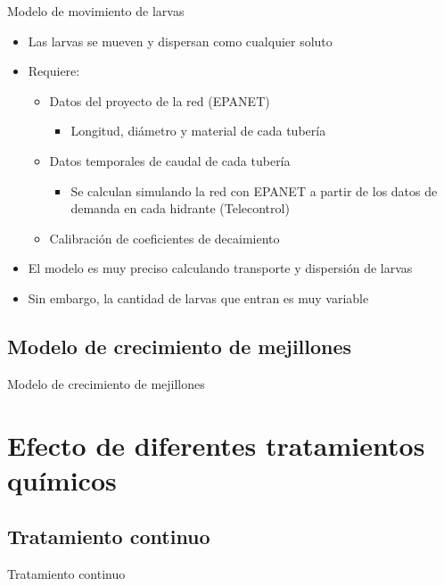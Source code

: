 \documentclass[pdr]{beamer}
\begin{document}
\begin{frame}{Modelo de movimiento de larvas}
	\begin{itemize}
		\item Las larvas se mueven y dispersan como cualquier soluto
		\item Requiere:
		\begin{itemize}
			\item Datos del proyecto de la red (EPANET)
			\begin{itemize}
				\item Longitud, diámetro y material de cada
					tubería
			\end{itemize}
			\item Datos temporales de caudal de cada tubería
			\begin{itemize}
				\item Se calculan simulando la red con EPANET a
					partir de los datos de demanda en cada
					hidrante (Telecontrol)
			\end{itemize}
			\item Calibración de coeficientes de decaimiento
		\end{itemize}
		\item El modelo es muy preciso calculando transporte y
			dispersión de larvas
		\item Sin embargo, la cantidad de larvas que entran es muy
			variable
	\end{itemize}
\end{frame}

\subsection{Modelo de crecimiento de mejillones}

\begin{frame}{Modelo de crecimiento de mejillones}
\end{frame}

\section{Efecto de diferentes tratamientos químicos}

\subsection{Tratamiento continuo}

\begin{frame}{Tratamiento continuo}
\end{frame}
\end{document}
